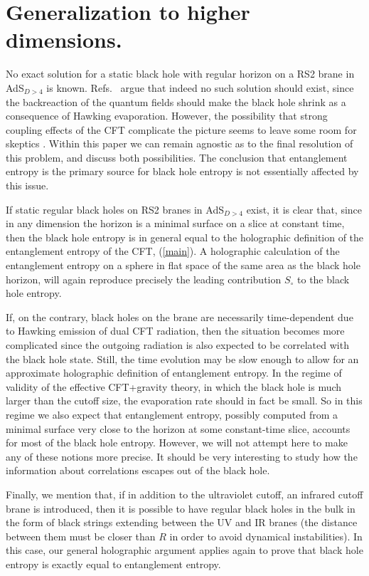 \documentclass[12pt]{article}
\newcommand{\reef}[1]{(\ref{#1})}
\begin{document}
\section{Generalization to higher dimensions.} No exact
solution for a static black hole with regular horizon on a RS2 brane in
AdS$_{D>4}$ is known. Refs.~\cite{tanaka,efk} argue that indeed no such
solution should exist, since the backreaction of the quantum fields
should make the black hole shrink as a consequence of Hawking
evaporation. However, the possibility that strong coupling effects of
the CFT complicate the picture seems to leave some room for skeptics
\cite{rob}. Within this paper we can remain agnostic as to the final
resolution of this problem, and discuss both possibilities. The
conclusion that entanglement entropy is the primary source for black
hole entropy is not essentially affected by this issue.

If static regular black holes on RS2 branes in AdS$_{D>4}$ exist,
it is clear that, since in any dimension the horizon is a minimal
surface on a slice at constant time, then the black hole entropy is in
general equal to the holographic definition of the entanglement entropy
of the CFT, \reef{main}. A holographic calculation of the entanglement
entropy on a sphere in flat space of the same area as the black hole
horizon, will again reproduce precisely the leading contribution
$S_{\circ}$ to the black hole entropy. 

If, on the contrary, black holes on the brane are necessarily
time-dependent due to Hawking emission of dual CFT radiation, then the
situation becomes more complicated since the outgoing radiation is also
expected to be correlated with the black hole state. Still, the time
evolution may be slow enough to allow for an approximate holographic
definition of entanglement entropy. In the regime of validity of the
effective CFT+gravity theory, in which the black hole is much larger
than the cutoff size, the evaporation rate should in fact be small. So
in this regime we also expect that entanglement entropy, possibly
computed from a minimal surface very close to the horizon at some
constant-time slice, accounts for most of the black hole entropy.
However, we will not attempt here to make any of these notions more
precise. It should be very interesting to study how the information
about correlations escapes out of the black hole. 

Finally, we mention that, if in addition to the ultraviolet cutoff, an
infrared cutoff brane is introduced, then it is possible to have regular
black holes in the bulk in the form of black strings extending between
the UV and IR branes (the distance between them must be closer than $R$
in order to avoid dynamical instabilities). In this case, our general
holographic argument applies again to prove that black hole entropy is
exactly equal to entanglement entropy.
\end{document}
